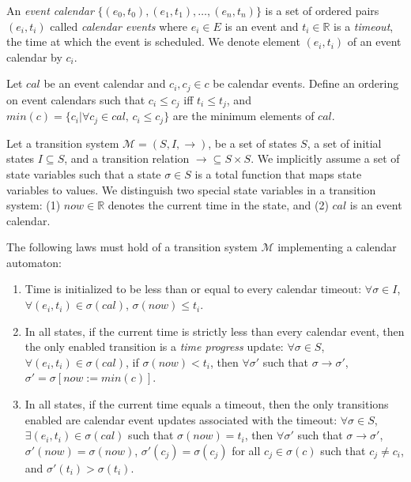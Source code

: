 \documentclass{llncs/llncs}
\newcommand{\ben}[1]{ } %
\newcommand{\ben}[1]{ {\color{purple}$<$ben: #1$>$} } %
\begin{document}
An \emph{event calendar} $\{ (e_0, t_0), (e_1, t_1), \ldots, (e_n, t_n) \}$ is a set of ordered pairs $(e_i, t_i)$ called \emph{calendar events} where $e_i \in E$ is an event and $t_i \in \mathbb{R}$ is a \emph{timeout}, the time at which the event is scheduled. We denote element $(e_i, t_i)$ of an event calendar by $c_i$.

Let $cal$ be an event calendar and $c_i, c_j \in c$ be calendar events. Define an ordering on event calendars such that $c_i \leq c_j$ iff $t_i \leq t_j$, and $min(c) = \{ c_i | \forall c_j \in cal, \, c_i \leq c_j  \}$ are the minimum elements of $cal$.

Let a transition system $\mathcal{M} = (S, I, \rightarrow)$, be a set of states $S$, a set of initial states $I \subseteq S$, and a transition relation $\rightarrow \subseteq S \times S$. We implicitly assume a set of state variables such that a state $\sigma \in S$ is a total function that maps state variables to values. We distinguish two special state variables in a transition system: (1) $now \in \mathbb{R}$ denotes the current time in the state, and (2) $cal$ is an event calendar.

The following laws must hold of a transition system $\mathcal{M}$ implementing a calendar automaton:

\begin{enumerate}
\item \label{cal:a} Time is initialized to be less than or equal to every calendar timeout: $\forall \sigma \in I$, $\forall (e_i, t_i) \in \sigma(cal)$, $\sigma(now) \leq t_i$.


\item \label{cal:c} In all states, if the current time is strictly less than every calendar event, then the only enabled transition is a \emph{time progress} update: $\forall \sigma \in S$, $\forall (e_i, t_i) \in \sigma(cal)$, if $\sigma(now) < t_i$, then $\forall \sigma'$ such that $\sigma \rightarrow \sigma'$, $\sigma' = \sigma[now := min(c)]$.

\item \label{cal:d} In all states, if the current time equals a timeout, then the only transitions enabled are calendar event updates associated with the timeout: $\forall \sigma \in S$, $\exists (e_i, t_i) \in \sigma(cal)$ such that $\sigma(now) = t_i$, then $\forall \sigma'$ such that $\sigma \rightarrow \sigma'$, $\sigma'(now) = \sigma(now)$, $\sigma'(c_j) = \sigma(c_j)$ for all $c_j \in \sigma(c)$ such that $c_j \neq c_i$, and $\sigma'(t_i) > \sigma(t_i)$.
\end{enumerate}
\ben{Do we also require that $c_i \notin \sigma'(c)$ ?}
\end{document}
